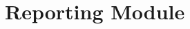 \documentclass[11pt,fleqn]{book} %
\begin{document}
%				
%				
%				
%				
			
	\section{Reporting Module}
\end{document}
